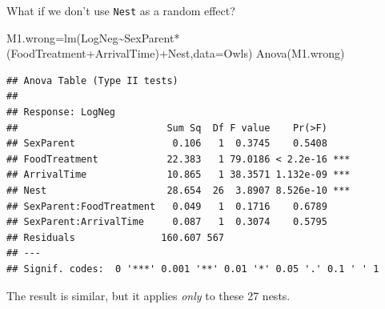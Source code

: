 \documentclass[
  ignorenonframetext,
]{beamer}
\newenvironment{Shaded}{\begin{snugshade}}{\end{snugshade}}
\newcommand{\AttributeTok}[1]{\textcolor[rgb]{0.77,0.63,0.00}{#1}}
\newcommand{\FunctionTok}[1]{\textcolor[rgb]{0.00,0.00,0.00}{#1}}
\newcommand{\NormalTok}[1]{#1}
\newcommand{\OtherTok}[1]{\textcolor[rgb]{0.56,0.35,0.01}{#1}}
\newcommand{\SpecialCharTok}[1]{\textcolor[rgb]{0.00,0.00,0.00}{#1}}
\begin{document}
\begin{frame}[fragile]{What if we don't use \texttt{Nest} as a random
effect?}
\protect\hypertarget{what-if-we-dont-use-nest-as-a-random-effect}{}
\scriptsize

\begin{Shaded}
\begin{Highlighting}[]
\NormalTok{M1.wrong}\OtherTok{=}\FunctionTok{lm}\NormalTok{(LogNeg}\SpecialCharTok{\textasciitilde{}}\NormalTok{SexParent}\SpecialCharTok{*}\NormalTok{(FoodTreatment}\SpecialCharTok{+}\NormalTok{ArrivalTime)}\SpecialCharTok{+}\NormalTok{Nest,}\AttributeTok{data=}\NormalTok{Owls)}
\FunctionTok{Anova}\NormalTok{(M1.wrong)}
\end{Highlighting}
\end{Shaded}

\begin{verbatim}
## Anova Table (Type II tests)
## 
## Response: LogNeg
##                          Sum Sq  Df F value    Pr(>F)    
## SexParent                 0.106   1  0.3745    0.5408    
## FoodTreatment            22.383   1 79.0186 < 2.2e-16 ***
## ArrivalTime              10.865   1 38.3571 1.132e-09 ***
## Nest                     28.654  26  3.8907 8.526e-10 ***
## SexParent:FoodTreatment   0.049   1  0.1716    0.6789    
## SexParent:ArrivalTime     0.087   1  0.3074    0.5795    
## Residuals               160.607 567                      
## ---
## Signif. codes:  0 '***' 0.001 '**' 0.01 '*' 0.05 '.' 0.1 ' ' 1
\end{verbatim}

\normalsize

The result is similar, but it applies \emph{only} to these 27 nests.
\end{frame}
\end{document}
